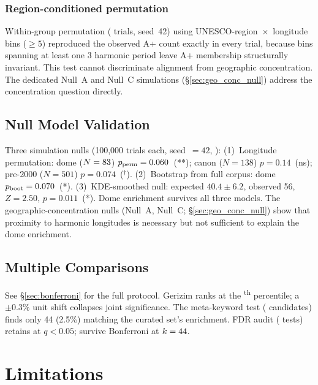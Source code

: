 \documentclass[12pt,a4paper]{article}
\begin{document}
\subsubsection*{Region-conditioned permutation}

Within-group permutation (\regionCondNperms{} trials, seed~42) using
UNESCO-region~$\times$~longitude bins ($\geq 5$\textdegree{}) reproduced
the observed A+ count exactly in every trial, because bins spanning at
least one 3\textdegree{} harmonic period leave A+ membership structurally
invariant. This test cannot discriminate alignment from geographic
concentration. The dedicated Null~A and Null~C simulations
(\S\ref{sec:geo_conc_null}) address the concentration question directly.

\subsection{Null Model Validation}
\label{sec:simulation_null}

Three simulation nulls (100{,}000 trials each, seed~$= 42$,
\citealt{good2005permutation}):
(1)~Longitude permutation: dome ($N = 83$)
$p_\mathrm{perm} = 0.060$~(**);
canon ($N = 138$) $p = 0.14$~(ns);
pre-2000 ($N = 501$) $p = 0.074$~($^\dagger$).
(2)~Bootstrap from full corpus: dome $p_\mathrm{boot} = 0.070$~(*).
(3)~KDE-smoothed null: expected $40.4 \pm 6.2$, observed 56, $Z = 2.50$,
$p = 0.011$~(*).
Dome enrichment survives all three models.
The geographic-concentration nulls (Null~A, Null~C;
\S\ref{sec:geo_conc_null}) show that proximity to harmonic longitudes
is necessary but not sufficient to explain the dome enrichment.

\subsection{Multiple Comparisons}
\label{sec:sharpshooter}

See \S\ref{sec:bonferroni} for the full protocol.
Gerizim ranks at the \anchorSweepPctile{}\textsuperscript{th} percentile;
a $\pm 0.3\%$ unit shift collapses joint significance.
The meta-keyword test (\NmetaKeywords{} candidates) finds only 44 (2.5\%)
matching the curated set's enrichment.
FDR audit (\NtotalTests{} tests) retains \NsurviveFDR{} at $q < 0.05$;
\NsurviveBonfAll{} survive Bonferroni at $k = 44$.

\section{Limitations}
\label{sec:limitations}
\end{document}
